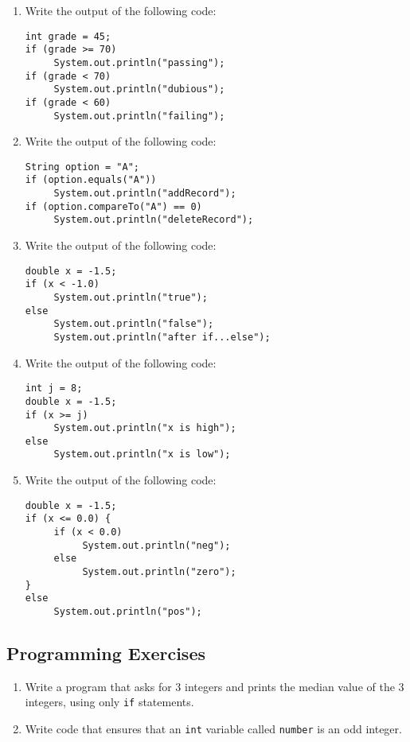 \begin{enumerate}[label={\arabic{counter}\addtocounter{counter}{1}}.]
\item Write the output of the following code:
\begin{lstlisting}
int grade = 45;
if (grade >= 70)
     System.out.println("passing");
if (grade < 70)
     System.out.println("dubious");
if (grade < 60)
     System.out.println("failing");
\end{lstlisting}

\item Write the output of the following code:
\begin{lstlisting}
String option = "A";
if (option.equals("A"))
     System.out.println("addRecord");
if (option.compareTo("A") == 0)
     System.out.println("deleteRecord");
\end{lstlisting}

\item Write the output of the following code:
\begin{lstlisting}
double x = -1.5;
if (x < -1.0)
     System.out.println("true");
else
     System.out.println("false");
     System.out.println("after if...else");
\end{lstlisting}

\item Write the output of the following code:
\begin{lstlisting}
int j = 8;
double x = -1.5;
if (x >= j)
     System.out.println("x is high");
else
     System.out.println("x is low");
\end{lstlisting}

\item Write the output of the following code:
\begin{lstlisting}
double x = -1.5;
if (x <= 0.0) {
     if (x < 0.0)
          System.out.println("neg");
     else
          System.out.println("zero");
}
else
     System.out.println("pos");
\end{lstlisting}

\end{enumerate}

\subsection{Programming Exercises}

\setcounter{counter}{1}
\begin{enumerate}[label={\arabic{counter}\addtocounter{counter}{1}}.]

\item Write a program that asks for 3 integers and prints the median value of the 3 integers, using only \verb|if| statements.

\item Write code that ensures that an \verb|int| variable called \verb|number| is an odd integer.

\end{enumerate}